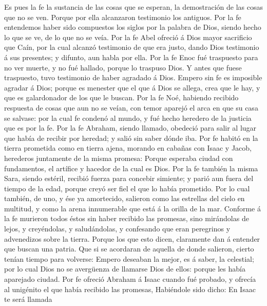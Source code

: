  Es pues la fe la sustancia de las cosas que se esperan,
la demostración de las cosas que no se ven.  Porque por
ella alcanzaron testimonio los antiguos.  Por la fe
entendemos haber sido compuestos los siglos por la palabra de Dios,
siendo hecho lo que se ve, de lo que no se veía.  Por la
fe Abel ofreció á Dios mayor sacrificio que Caín, por la cual alcanzó
testimonio de que era justo, dando Dios testimonio á sus presentes; y
difunto, aun habla por ella.  Por la fe Enoc fué
traspuesto para no ver muerte, y no fué hallado, porque lo traspuso
Dios. Y antes que fuese traspuesto, tuvo testimonio de haber agradado á
Dios.  Empero sin fe es imposible agradar á Dios; porque
es menester que el que á Dios se allega, crea que le hay, y que es
galardonador de los que le buscan.  Por la fe Noé,
habiendo recibido respuesta de cosas que aun no se veían, con temor
aparejó el arca en que su casa se salvase: por la cual fe condenó al
mundo, y fué hecho heredero de la justicia que es por la fe.
 Por la fe Abraham, siendo llamado, obedeció para salir al
lugar que había de recibir por heredad; y salió sin saber dónde iba.
 Por fe habitó en la tierra prometida como en tierra
ajena, morando en cabañas con Isaac y Jacob, herederos juntamente de la
misma promesa:  Porque esperaba ciudad con fundamentos,
el artífice y hacedor de la cual es Dios.  Por la fe
también la misma Sara, siendo estéril, recibió fuerza para concebir
simiente; y parió aun fuera del tiempo de la edad, porque creyó ser fiel
el que lo había prometido.  Por lo cual también, de uno,
y ése ya amortecido, salieron como las estrellas del cielo en multitud,
y como la arena innumerable que está á la orilla de la mar.
 Conforme á la fe murieron todos éstos sin haber recibido
las promesas, sino mirándolas de lejos, y creyéndolas, y saludándolas, y
confesando que eran peregrinos y advenedizos sobre la tierra.
 Porque los que esto dicen, claramente dan á entender que
buscan una patria.  Que si se acordaran de aquella de
donde salieron, cierto tenían tiempo para volverse: 
Empero deseaban la mejor, es á saber, la celestial; por lo cual Dios no
se avergüenza de llamarse Dios de ellos: porque les había aparejado
ciudad.  Por fe ofreció Abraham á Isaac cuando fué
probado, y ofrecía al unigénito el que había recibido las promesas,
 Habiéndole sido dicho: En Isaac te será llamada

